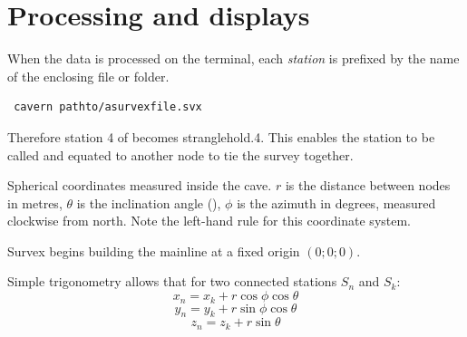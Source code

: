 \section{Processing and displays}
When the data is processed on the terminal, each \emph{station} is prefixed by the name of the enclosing file or folder. 

 \begin{verbatim} cavern pathto/asurvexfile.svx \end{verbatim} 

Therefore station 4 of  becomes stranglehold.4. This enables the station to be called and equated to another node to tie the survey together. 

\begin{marginfigure}
\caption{Spherical coordinates measured inside the cave. $r$ is the distance between nodes in metres, $\theta$ is the inclination angle (\textdegree), $\phi$ is the azimuth in degrees, measured clockwise from north. Note the left-hand rule for this coordinate system.}
\end{marginfigure}

Survex begins building the mainline at a fixed origin  $(0;0;0)$.

Simple trigonometry allows that for two connected stations $S_n$ and $S_k$:
$$x_{n} = x_{k}+ r \cos\phi\cos\theta $$
$$y_{n} = y_{k}+ r \sin\phi\cos\theta $$
$$z_{n} = z_{k}+ r \sin\theta$$

